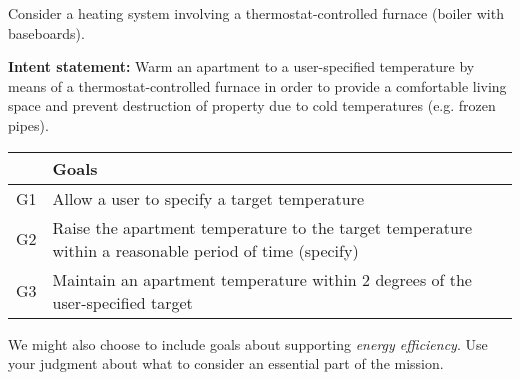 Consider a heating system involving a thermostat-controlled furnace (boiler with baseboards).

\textbf{Intent statement:} Warm an apartment to a user-specified temperature by means of a thermostat-controlled furnace in order to provide a comfortable living space and prevent destruction of property due to cold temperatures (e.g. frozen pipes).

\begin{tabular}{|l|p{9cm}|}
\hline
&\textbf{Goals}\\
\hline
G1 & Allow a user to specify a target temperature\\
\hline
G2 & Raise the apartment temperature to the target temperature within a reasonable period of time (specify)\\
\hline
G3 & Maintain an apartment temperature within 2 degrees of the user-specified target\\
\hline
\end{tabular}
\vspace{1em}

We might also choose to include goals about supporting \emph{energy efficiency}.
Use your judgment about what to consider an essential part of the mission.
